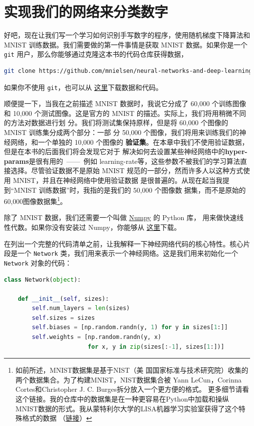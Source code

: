 \section{实现我们的网络来分类数字}
\label{sec:implementing_our_network_to_classify_digits}

好吧，现在让我们写一个学习如何识别手写数字的程序，使用随机梯度下降算法和 MNIST
训练数据。我们需要做的第一件事情是获取 MNIST 数据。如果你是一个 \lstinline!git!
用户，那么你能够通过克隆这本书的代码仓库获得数据，

\begin{lstlisting}[language=sh]
git clone https://github.com/mnielsen/neural-networks-and-deep-learning.git
\end{lstlisting}

如果你不使用 \lstinline!git!，也可以从%
\href{https://github.com/mnielsen/neural-networks-and-deep-learning/archive/master.zip}{
  这里}下载数据和代码。

顺便提一下，当我在之前描述 MNIST 数据时，我说它分成了 60,000 个训练图像和 10,000
个测试图像。这是官方的 MNIST 的描述。实际上，我们将用稍微不同的方法对数据进行划
分。我们将测试集保持原样，但是将 60,000 个图像的 MNIST 训练集分成两个部分：一部
分 50,000 个图像，我们将用来训练我们的神经网络，和一个单独的 10,000 个图像的%
\textbf{验证集}。在本章中我们不使用验证数据，但是在本书的后面我们将会发现它对于
解决如何去设置某些神经网络中的\textbf{\gls{hyper-params}}是很有用的~——~例如%
\gls*{learning-rate}等，这些参数不被我们的学习算法直接选择。尽管验证数据不是原始
MNIST 规范的一部分，然而许多人以这种方式使用 MNIST，并且在神经网络中使用验证数据
是很普遍的。从现在起当我提到“MNIST 训练数据”时，我指的是我们的 50,000 个图像数
据集，而不是原始的 60,000图像数据集\footnote{如前所述，MNIST数据集是基于NIST（美
    国国家标准与技术研究院）收集的两个数据集合。为了构建MNIST，NIST数据集合被
  Yann LeCun，Corinna Cortes和Christopher J. C. Burges拆分放入一个更方便的格式。
  更多细节请看这个链接。我的仓库中的数据集是在一种更容易在Python中加载和操纵
  MNIST数据的形式。我从蒙特利尔大学的LISA机器学习实验室获得了这个特殊格式的数据
  （\href{http://www.deeplearning.net/tutorial/gettingstarted.html}{链接}）}。

除了 MNIST 数据，我们还需要一个叫做 \href{http://numpy.org/}{Numpy} 的 Python 库，
用来做快速线性代数。如果你没有安装过 Numpy，你能够从%
\href{http://www.scipy.org/install.html}{这里}下载。

在列出一个完整的代码清单之前，让我解释一下神经网络代码的核心特性。核心片段是一个
\lstinline!Network! 类，我们用来表示一个神经网络。这是我们用来初始化一个
\lstinline!Network! 对象的代码：
\begin{lstlisting}[language=Python]
class Network(object):

	def __init__(self, sizes):
		self.num_layers = len(sizes)
		self.sizes = sizes
		self.biases = [np.random.randn(y, 1) for y in sizes[1:]]
		self.weights = [np.random.randn(y, x)
						for x, y in zip(sizes[:-1], sizes[1:])]
\end{lstlisting}

